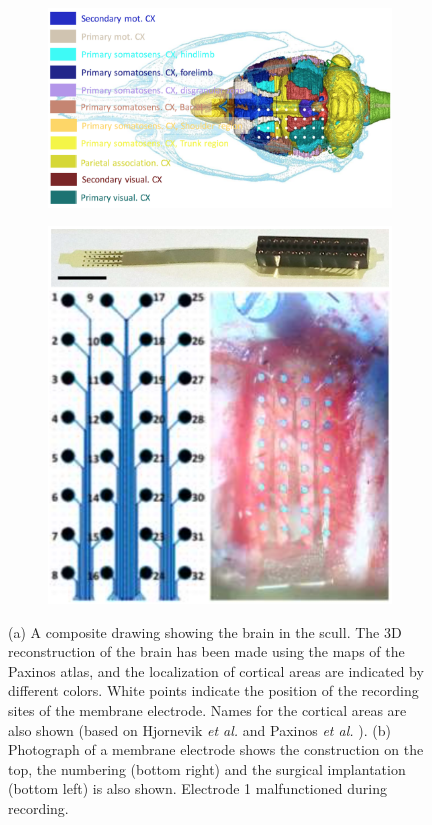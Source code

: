 \documentclass[journal,12pt,onecolumn,draftclsnofoot]{IEEEtran}  %
\begin{document}
\begin{figure}[H]
  \centering
  \begin{subfigure}[b]{0.45\textwidth}
    \includegraphics[width=0.95\linewidth]{figures/rat_brain_schematic.png}
    \caption{}
  \end{subfigure}
  \begin{subfigure}[b]{0.45\textwidth}
    \centering
    \includegraphics[width=0.95\linewidth]{figures/rat_scull_and_instrument.png}
    \caption{}
  \end{subfigure}
  \caption{(a) A composite drawing showing the brain in the scull. The 3D reconstruction of the brain has been made using the maps of the Paxinos atlas, and the localization of cortical areas are indicated by different colors. White points indicate the position of the recording sites of the membrane electrode. Names for the cortical areas are also shown (based on Hjornevik \textit{et al.} and Paxinos \textit{et al.} \cite{hjornevik2007} \cite{paxinos2009}). (b) Photograph of a membrane electrode shows the construction on the top, the numbering (bottom right) and the surgical implantation (bottom left) is also shown. Electrode 1 malfunctioned during recording.}
  \label{fig:rat_experiment}
\end{figure}
\end{document}
